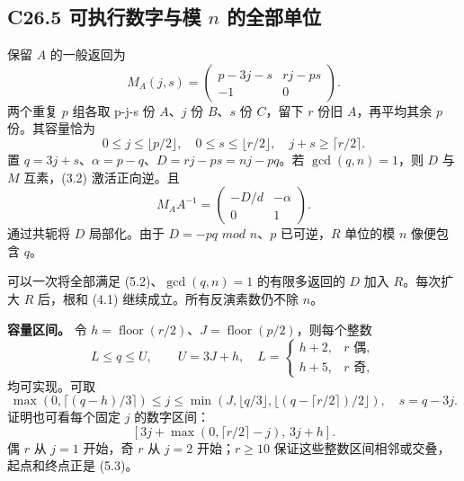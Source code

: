 \documentclass[11pt,a4paper]{article}
\theoremstyle{definition}
\numberwithin{equation}{section}
\begin{document}
\subsection*{\texorpdfstring{{C26.5} {可执行数字与模} {\ensuremath{n}} {的全部单位}}{C26.5 可执行数字与模  的全部单位}}\label{C26-h163}

{保留} {\ensuremath{A}} {的一般返回为} \[
M_A(j,s)=
\begin{pmatrix}p-3j-s&rj-ps\\-1&0\end{pmatrix}.
\tag{C26.5.1}
\] {两个重复} {\ensuremath{p}} {组各取} {p-j-s} {份} {\ensuremath{A}、\ensuremath{j}} {份} {\ensuremath{B}、\ensuremath{s}} {份} {\ensuremath{C}，留下} {\ensuremath{r}} {份旧} {\ensuremath{A}，再平均其余} {\ensuremath{p}} {份。其容量恰为} \[
0\le j\le\lfloor p/2\rfloor,\quad
0\le s\le\lfloor r/2\rfloor,\quad
j+s\ge\lceil r/2\rceil.
\tag{C26.5.2}
\] {置} {\ensuremath{q=3j+s}、\ensuremath{\alpha =p-q}、\ensuremath{D=rj-ps=nj-pq}。若} {\ensuremath{\operatorname{gcd}(q,n)=1}，则} {\ensuremath{D}} {与} {\ensuremath{M}} {互素，(3.2)} {激活正向逆。且} \[
M_AA^{-1}=\begin{pmatrix}-D/d&-\alpha\\0&1\end{pmatrix}.
\] {通过共轭将} {\ensuremath{D}} {局部化。由于} {\ensuremath{D=-pq}} {\ensuremath{mod}} {\ensuremath{n}、\ensuremath{p}} {已可逆，\ensuremath{R}} {单位的模} {\ensuremath{n}} {像便包含} {\ensuremath{q}。}

{可以一次将全部满足} {(5.2)、\ensuremath{\operatorname{gcd}(q,n)=1}} {的有限多返回的} {\ensuremath{D}} {加入} {\ensuremath{R}。每次扩大} {\ensuremath{R}} {后，根和} {(4.1)} {继续成立。所有反演素数仍不除} {\ensuremath{n}。}

\textbf{{容量区间。}} {令} {\ensuremath{h=\operatorname{floor}(r/2)}、\ensuremath{J=\operatorname{floor}(p/2)}，则每个整数} \[
L\le q\le U,\qquad
U=3J+h,\quad
L=\begin{cases}h+2,&r\text{ 偶},\\h+5,&r\text{ 奇},\end{cases}
\tag{C26.5.3}
\] {均可实现。可取} \[
\max(0,\lceil(q-h)/3\rceil)\le j\le
\min(J,\lfloor q/3\rfloor,\lfloor(q-\lceil r/2\rceil)/2\rfloor),
\quad s=q-3j.
\tag{C26.5.4}
\] {证明也可看每个固定} {\ensuremath{j}} {的数字区间：} \[
[3j+\max(0,\lceil r/2\rceil-j),\,3j+h].
\] {偶} {\ensuremath{r}} {从} {\ensuremath{j=1}} {开始，奇} {\ensuremath{r}} {从} {\ensuremath{j=2}} {开始；\ensuremath{r\ge 10}} {保证这些整数区间相邻或交叠，起点和终点正是} {(5.3)。}
\end{document}
